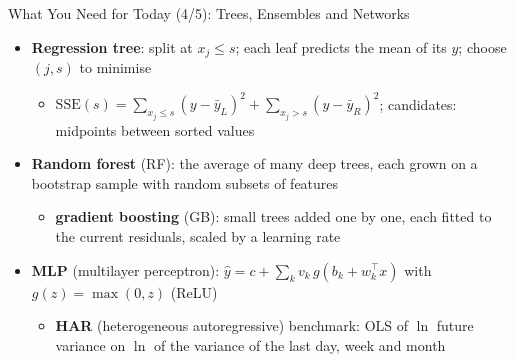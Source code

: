 \begin{frame}{What You Need for Today (4/5): Trees, Ensembles and Networks}
\itemsize{\small}
\begin{itemize}
    \item \textbf{Regression tree}: split at $x_j \le s$; each leaf predicts the mean of its $y$; choose $(j, s)$ to minimise
    \begin{itemize}
        \item $\mathrm{SSE}(s) = \sum_{x_j \le s}(y - \bar y_L)^2 + \sum_{x_j > s}(y - \bar y_R)^2$; candidates: midpoints between sorted values
    \end{itemize}
    \item \textbf{Random forest} (RF): the average of many deep trees, each grown on a bootstrap sample with random subsets of features
    \begin{itemize}
        \item \textbf{gradient boosting} (GB): small trees added one by one, each fitted to the current residuals, scaled by a learning rate
    \end{itemize}
    \item \textbf{MLP} (multilayer perceptron): $\hat y = c + \sum_k v_k\, g(b_k + w_k^\top x)$ with $g(z) = \max(0, z)$ (ReLU)
    \begin{itemize}
        \item \textbf{HAR} (heterogeneous autoregressive) benchmark: OLS of $\ln$ future variance on $\ln$ of the variance of the last day, week and month
    \end{itemize}
\end{itemize}
\end{frame}

